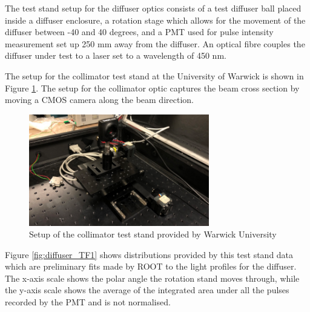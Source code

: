 The test stand setup for the diffuser optics consists of a test diffuser ball placed inside a diffuser enclosure, a rotation stage which allows for the movement of the diffuser between -40 and 40 degrees, and a PMT used for pulse intensity measurement set up 250 mm away from the diffuser. An optical fibre couples the diffuser under test to a laser set to a wavelength of 450 nm. 

The setup for the collimator test stand at the University of Warwick is shown in Figure \ref{fig:coll_test_stand}.  The setup for the collimator optic captures the beam cross section by moving a CMOS camera along the beam direction. 

\begin{figure}
    \centering
    \includegraphics[width=0.7\textwidth]{Figures/coll_test_stand.png}
    \caption{Setup of the collimator test stand provided by Warwick University}
    \label{fig:coll_test_stand}
\end{figure}

Figure \ref{fig:diffuser_TF1} shows distributions provided by this test stand data which are preliminary fits made by ROOT to the light profiles for the diffuser.  The x-axis scale shows the polar angle the rotation stand moves through, while the y-axis scale shows the average of the integrated area under all the pulses recorded by the PMT and is not normalised. 

